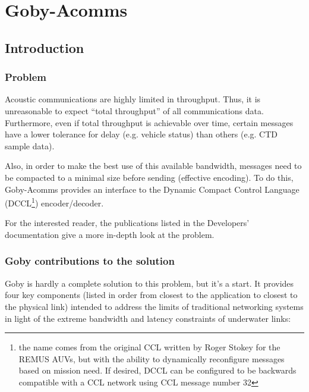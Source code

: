 \chapter{Goby-Acomms}\label{chap:acomms}
\MakeShortVerb{\!} %

\section{Introduction}

\subsection{Problem}
Acoustic communications are highly limited in throughput. Thus, it is unreasonable to expect ``total throughput'' of all communications data. Furthermore, even if total throughput is achievable over time, certain messages have a lower tolerance for delay (e.g. vehicle status) than others (e.g. CTD sample data). 

Also, in order to make the best use of this available bandwidth, messages need to be compacted to a minimal size before sending (effective encoding). To do this, Goby-Acomms provides an interface to the Dynamic Compact Control Language (DCCL\footnote{the name comes from the original CCL written by Roger Stokey for the REMUS AUVs, but with the ability to dynamically reconfigure messages based on mission need. If desired, DCCL can be configured to be backwards compatible with a CCL network using CCL message number 32}) encoder/decoder. 

For the interested reader, the publications listed in the Developers' documentation \cite{goby-doc} give a more in-depth look at the problem.

\subsection{Goby contributions to the solution}

Goby is hardly a complete solution to this problem, but it's a start. It provides four key components (listed in order from closest to the application to closest to the physical link) intended to address the limits of traditional networking systems in light of the extreme bandwidth and latency constraints of underwater links:

